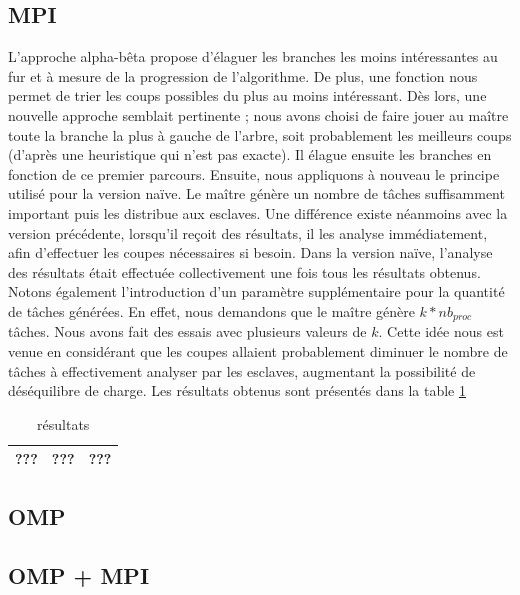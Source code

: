 \documentclass[12pt]{article}
\begin{document}
    \subsection{MPI}
    L'approche alpha-bêta propose d'élaguer les branches
    les moins intéressantes au fur et à mesure de la progression de 
    l'algorithme. De plus, une fonction nous permet de trier les coups
    possibles du plus au moins intéressant. Dès lors, une nouvelle 
    approche semblait pertinente ; nous avons choisi de faire jouer au
    maître toute la branche la plus à gauche de l'arbre, soit
    probablement les meilleurs coups (d'après une heuristique qui n'est pas 
    exacte). Il élague ensuite les branches en fonction de ce premier
    parcours. Ensuite, nous appliquons à nouveau le principe utilisé pour
    la version naïve. Le maître génère un nombre de tâches suffisamment
    important puis les distribue aux esclaves. Une différence existe
    néanmoins avec la version précédente, lorsqu'il reçoit des résultats,
    il les analyse immédiatement, afin d'effectuer les coupes nécessaires
    si besoin. Dans la version naïve, l'analyse des résultats était
    effectuée collectivement une fois tous les résultats obtenus.
    Notons également l'introduction d'un paramètre supplémentaire pour
    la quantité de tâches générées. En effet, nous demandons que le maître
    génère $k*nb_{proc}$ tâches. Nous avons fait des essais avec plusieurs
    valeurs de $k$. Cette idée nous est venue en considérant que les coupes
    allaient probablement diminuer le nombre de tâches à effectivement
    analyser par les esclaves, augmentant la possibilité de déséquilibre
    de charge. Les résultats obtenus sont présentés dans la table
    \ref{tab:alpha}
    \begin{table} \begin{center}
    	\begin{tabular}{|c|c|c|}
    	\hline
    	??? & ??? & ??? \\ \hline
    	\end{tabular}
    	\caption{\label{tab:alpha}\color{red} résultats}
    \end{center} \end{table}
    \subsection{OMP}
    \subsection{OMP + MPI}
\end{document}
